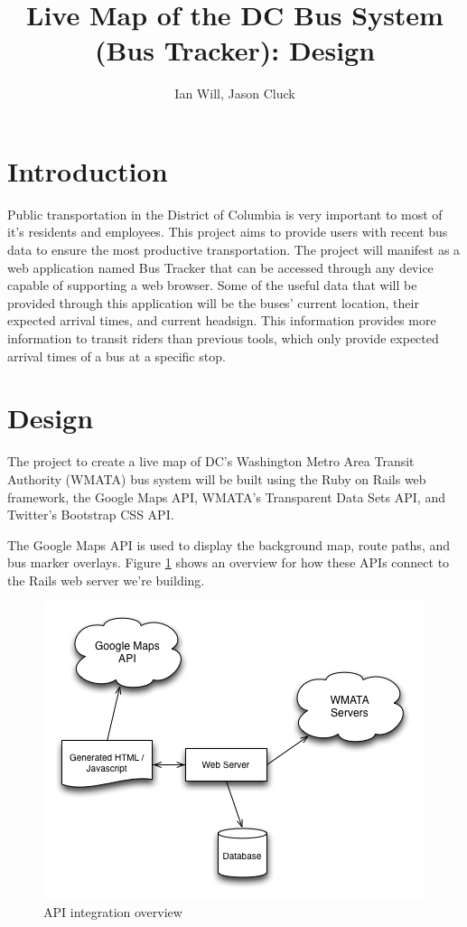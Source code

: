 \documentclass[12pt]{article}
\title{Live Map of the DC Bus System (Bus Tracker): Design}
\author{Ian Will, Jason Cluck}
\date{}
\begin{document}
\maketitle

\section*{Introduction}
	Public transportation in the District of Columbia is very important to most of it's residents and employees.  This project aims to provide users with recent bus data to ensure the most productive transportation.  The project will manifest as a web application named Bus Tracker that can be accessed through any device capable of supporting a web browser.  Some of the useful data that will be provided through this application will be the buses' current location, their expected arrival times, and current headsign.  This information provides more information to transit riders than previous tools, which only provide expected arrival times of a bus at a specific stop.

\section*{Design}

The project to create a live map of DC's Washington Metro Area Transit Authority (WMATA) bus system will be built using the Ruby on Rails web framework, the Google Maps API, WMATA's Transparent Data Sets API, and Twitter's Bootstrap CSS API.

The Google Maps API is used to display the background map, route paths, and bus marker overlays.  Figure \ref{fig:designOverview} shows an overview for how these APIs connect to the Rails web server we're building.

\begin{figure}[ht]
	\centerline{\includegraphics[scale=0.6]{design.png}}
	\caption{API integration overview}
	\label{fig:designOverview}
\end{figure}
\end{document}
